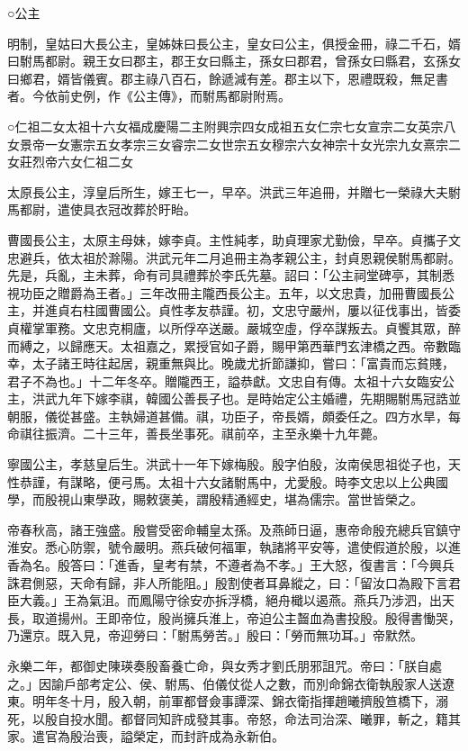

○公主

明制，皇姑曰大長公主，皇姊妹曰長公主，皇女曰公主，俱授金冊，祿二千石，婿曰駙馬都尉。親王女曰郡主，郡王女曰縣主，孫女曰郡君，曾孫女曰縣君，玄孫女曰鄉君，婿皆儀賓。郡主祿八百石，餘遞減有差。郡主以下，恩禮既殺，無足書者。今依前史例，作《公主傳》，而駙馬都尉附焉。

○仁祖二女太祖十六女福成慶陽二主附興宗四女成祖五女仁宗七女宣宗二女英宗八女景帝一女憲宗五女孝宗三女睿宗二女世宗五女穆宗六女神宗十女光宗九女熹宗二女莊烈帝六女仁祖二女

太原長公主，淳皇后所生，嫁王七一，早卒。洪武三年追冊，并贈七一榮祿大夫駙馬都尉，遣使具衣冠改葬於盱眙。

曹國長公主，太原主母妹，嫁李貞。主性純孝，助貞理家尤勤儉，早卒。貞攜子文忠避兵，依太祖於滁陽。洪武元年二月追冊主為孝親公主，封貞恩親侯駙馬都尉。先是，兵亂，主未葬，命有司具禮葬於李氏先墓。詔曰：「公主祠堂碑亭，其制悉視功臣之贈爵為王者。」三年改冊主隴西長公主。五年，以文忠貴，加冊曹國長公主，并進貞右柱國曹國公。貞性孝友恭謹。初，文忠守嚴州，屢以征伐事出，皆委貞權掌軍務。文忠克桐廬，以所俘卒送嚴。嚴城空虛，俘卒謀叛去。貞饗其眾，醉而縛之，以歸應天。太祖嘉之，累授官如子爵，賜甲第西華門玄津橋之西。帝數臨幸，太子諸王時往起居，親重無與比。晚歲尤折節謙抑，嘗曰：「富貴而忘貧賤，君子不為也。」十二年冬卒。贈隴西王，謚恭獻。文忠自有傳。太祖十六女臨安公主，洪武九年下嫁李祺，韓國公善長子也。是時始定公主婚禮，先期賜駙馬冠誥並朝服，儀從甚盛。主執婦道甚備。祺，功臣子，帝長婿，頗委任之。四方水旱，每命祺往振濟。二十三年，善長坐事死。祺前卒，主至永樂十九年薨。

寧國公主，孝慈皇后生。洪武十一年下嫁梅殷。殷字伯殷，汝南侯思祖從子也，天性恭謹，有謀略，便弓馬。太祖十六女諸駙馬中，尤愛殷。時李文忠以上公典國學，而殷視山東學政，賜敕褒美，謂殷精通經史，堪為儒宗。當世皆榮之。

帝春秋高，諸王強盛。殷嘗受密命輔皇太孫。及燕師日逼，惠帝命殷充總兵官鎮守淮安。悉心防禦，號令嚴明。燕兵破何福軍，執諸將平安等，遣使假道於殷，以進香為名。殷答曰：「進香，皇考有禁，不遵者為不孝。」王大怒，復書言：「今興兵誅君側惡，天命有歸，非人所能阻。」殷割使者耳鼻縱之，曰：「留汝口為殿下言君臣大義。」王為氣沮。而鳳陽守徐安亦拆浮橋，絕舟檝以遏燕。燕兵乃涉泗，出天長，取道揚州。王即帝位，殷尚擁兵淮上，帝迫公主齧血為書投殷。殷得書慟哭，乃還京。既入見，帝迎勞曰：「駙馬勞苦。」殷曰：「勞而無功耳。」帝默然。

永樂二年，都御史陳瑛奏殷畜養亡命，與女秀才劉氏朋邪詛咒。帝曰：「朕自處之。」因諭戶部考定公、侯、駙馬、伯儀仗從人之數，而別命錦衣衛執殷家人送遼東。明年冬十月，殷入朝，前軍都督僉事譚深、錦衣衛指揮趙曦擠殷笪橋下，溺死，以殷自投水聞。都督同知許成發其事。帝怒，命法司治深、曦罪，斬之，籍其家。遣官為殷治喪，謚榮定，而封許成為永新伯。


